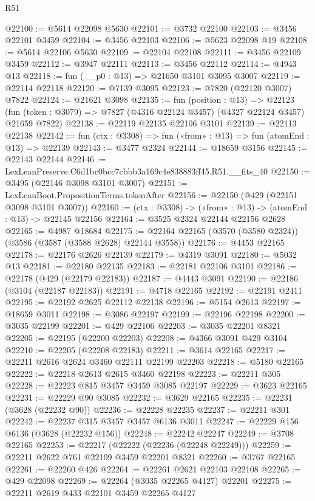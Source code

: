 \begin{lexlean}{R51}
\begin{coremodule}
@22100 := @5614 @22098 @5630
@22101 := @3732 @22100
@22103 := @3456 @22101 @3459
@22104 := @3456 @22103
@22106 := @5623 @22098 @19
@22108 := @5614 @22106 @5630
@22109 := @22104 @22108
@22111 := @3456 @22109 @3459
@22112 := @3947 @22111
@22113 := @3456 @22112
@22114 := @4943 @13
@22118 := fun (__p0 : @13) => @21650 @3101 @3095 @3007
@22119 := @22114 @22118
@22120 := @7139 @3095
@22123 := @7820 (@22120 @3007) @7822
@22124 := @21621 @3098
@22135 := fun (position : @13) =>
  @22123 (fun (token : @3079) => @7827 (@4316 @22124 @3457) (@4327 @22124 @3457) @21659 @7822)
@22138 := @22119 @22135 @22106 @3101
@22139 := @22113 @22138
@22142 := fun (ctx : @3308) => fun («from» : @13) => fun (atomEnd : @13) => @22139
@22143 := @3477 @2324
@22144 := @18659 @3156
@22145 := @22143 @22144
@22146 := LexLeanPreserve.C6d1bc0bcc7cbbb3a169c4e838883ff45.R51.__fits_40
@22150 := @3495 (@22146 @3098 @3101 @3007)
@22151 := LexLeanBoot.PropositionTerms.tokenAfter
@22156 := @22150 (@429 (@22151 @3098 @3101 @3007))
@22160 := (ctx : @3308) -> («from» : @13) -> (atomEnd : @13) -> @22145 @22156
@22164 := @3525 @2324 @22144 @22156 @2628
@22165 := @4987 @18684
@22175 := @22164 @22165 (@3570 (@3580 @2324)) (@3586 (@3587 (@3588 @2628) @22144 @3558))
@22176 := @4453 @22165
@22178 := @22176 @2626 @22139
@22179 := @4319 @3091
@22180 := @5032 @13
@22181 := @22180 @22135
@22183 := @22181 @22106 @3101
@22186 := @22178 (@429 (@22179 @22183))
@22187 := @4443 @3091
@22190 := @22186 (@3104 (@22187 @22183))
@22191 := @4718 @22165
@22192 := @22191 @2411
@22195 := @22192 @2625 @22112 @22138
@22196 := @5154 @2613
@22197 := @18659 @3011
@22198 := @3086 @22197
@22199 := @22196 @22198
@22200 := @3035 @22199
@22201 := @429 @22106
@22203 := @3035 @22201 @8321
@22205 := @22195 (@22200 @22203)
@22208 := @4366 @3091 @429 @3104
@22210 := @22205 (@22208 @22183)
@22211 := @3614 @22165
@22217 := @22211 @2616 @2624 @3460 @22111 @22199 @22203
@22218 := @5180 @22165
@22222 := @22218 @2613 @2615 @3460 @22198
@22223 := @22211 @305
@22228 := @22223 @815 @3457 @3459 @3085 @22197
@22229 := @3623 @22165
@22231 := @22229 @90 @3085
@22232 := @3629 @22165
@22235 := @22231 (@3628 (@22232 @90))
@22236 := @22228 @22235
@22237 := @22211 @301
@22242 := @22237 @315 @3457 @3457 @6136 @3011
@22247 := @22229 @156 @6136 (@3628 (@22232 @156))
@22248 := @22242 @22247
@22249 := @3708 @22165
@22253 := @22217 (@22222 (@22236 (@22248 @22249)))
@22259 := @22211 @2622 @761 @22109 @3459 @22201 @8321
@22260 := @3767 @22165
@22261 := @22260 @426
@22264 := @22261 @2621 @22103 @22108
@22265 := @429 @22098
@22269 := @22264 (@3035 @22265 @4127) @22201
@22275 := @22211 @2619 @433 @22101 @3459 @22265 @4127

\end{coremodule}
\end{lexlean}
